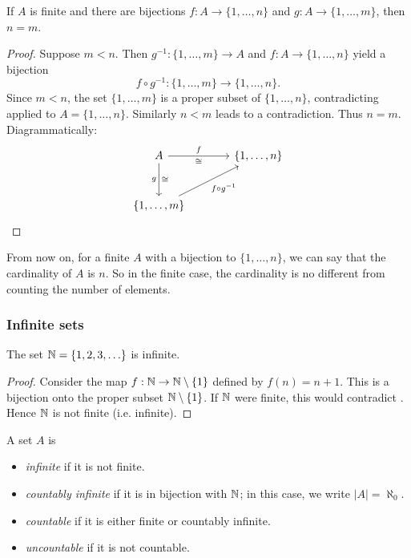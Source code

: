 \begin{corollary}\label{cor:unique-finite-card}
  If $A$ is finite and there are bijections $f:A\to \{1,\ldots,n\}$ and $g:A\to \{1,\ldots,m\}$, then $n=m$.
\end{corollary}
\begin{proof}
  Suppose $m<n$. Then $g^{-1}:\{1,\ldots,m\}\to A$ and $f: A\to \{1,\ldots,n\}$ yield a bijection
  \[
    f\circ g^{-1}: \{1,\ldots,m\} \longrightarrow \{1,\ldots,n\}.
  \]
  Since $m<n$, the set $\{1,\ldots,m\}$ is a proper subset of $\{1,\ldots,n\}$, contradicting  applied to $A=\{1,\ldots,n\}$. Similarly $n<m$ leads to a contradiction. Thus $n=m$.
  Diagrammatically:
  \[
  \begin{tikzcd}[row sep=large,column sep=large]
    A \arrow[r, "f", "\cong"'] \arrow[d, "g"', "\cong"] & \{1,\ldots,n\} \\
    \{1,\ldots,m\} \arrow[ur, "{f\circ g^{-1}}"'] &
  \end{tikzcd}
  \]
\end{proof}

From now on, for a finite $A$ with a bijection to $\{1,\ldots,n\}$, we can say that the cardinality of $A$ is $n$. So in the finite case, the cardinality is no different from counting the number of elements.




\subsubsection{Infinite sets}


\begin{corollary}\label{cor:Zplus-infinite}
  The set $\mathbb{N}=\{1,2,3,\ldots\}$ is infinite.
\end{corollary}
\begin{proof}
  Consider the map $f: \mathbb{N}\to \mathbb{N}\setminus\{1\}$ defined by $f(n)=n+1$. This is a bijection onto the proper subset $\mathbb{N}\setminus\{1\}$. If $\mathbb{N}$ were finite, this would contradict . Hence $\mathbb{N}$ is not finite (i.e. infinite).
\end{proof}

\begin{definition}
  A set $A$ is 
  \begin{itemize}
    \item \emph{infinite} if it is not finite.
    \item \emph{countably infinite} if it is in bijection with $\mathbb{N}$; in this case, we write \(|A| = \aleph_0\).
    \item \emph{countable} if it is either finite or countably infinite.
    \item \emph{uncountable} if it is not countable.
  \end{itemize}
\end{definition}


